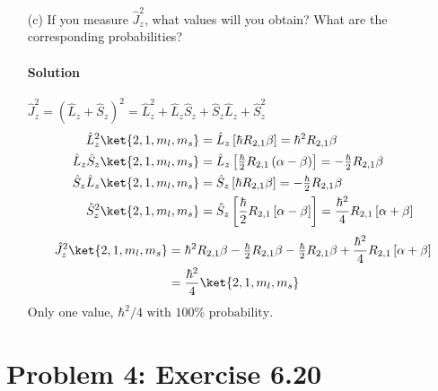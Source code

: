 \documentclass{article}
\numberwithin{equation}{section}
\begin{document}
\begin{enumerate}
		\item[(c)]  If you measure $\hat{J}_z^2$, what values will you obtain? What are the corresponding probabilities? 
		\paragraph{Solution} $\hat{J}_z^2 = ( \hat{L}_z + \hat{S}_z )^2 = \hat{L}^2_z + \hat{L}_z\hat{S}_z + \hat{S}_z\hat{L}_z + \hat{S}^2_z$
		\begin{align}
            \hat{L}^2_z \ket{2,1,m_l,m_s} &= \hat{L}_z \left[ \hbar R_{2,1} \beta \right] = \hbar^2 R_{2,1} \beta \\
            \hat{L}_z\hat{S}_z \ket{2,1,m_l,m_s} &= \hat{L}_z \left[ \tfrac{\hbar}{2} R_{2,1} \left( \alpha - \beta \right) \right] = - \tfrac{\hbar}{2} R_{2,1} \beta \\
            \hat{S}_z\hat{L}_z\ket{2,1,m_l,m_s} &= \hat{S}_z \left[ \hbar R_{2,1} \beta \right] = - \tfrac{\hbar}{2} R_{2,1} \beta \\
            \hat{S}^2_z \ket{2,1,m_l,m_s} &= \hat{S}_z \left[ \frac{\hbar}{2} R_{2,1} \left[ \alpha - \beta \right] \right] = \frac{\hbar^2}{4} R_{2,1} \left[ \alpha + \beta \right]
        \end{align}
        \begin{align}
            \hat{J}_z^2 \ket{2,1,m_l,m_s} &= \hbar^2 R_{2,1} \beta - \tfrac{\hbar}{2} R_{2,1} \beta - \tfrac{\hbar}{2} R_{2,1} \beta + \frac{\hbar^2}{4} R_{2,1} \left[ \alpha + \beta \right] \\
                                          &= \frac{\hbar^2}{4} \ket{2,1,m_l,m_s}
        \end{align}
        Only one value, $\boxed{\text{$\hbar^2 /4$ with $100\%$ probability}}$.
        
        
	\end{enumerate}

\clearpage

	\section{Problem 4: Exercise 6.20}
	
\end{document}
